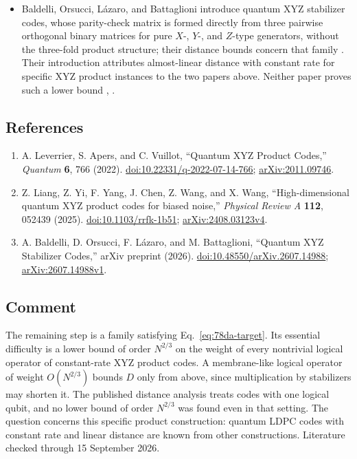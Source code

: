 \begin{itemize}
  \item Baldelli, Orsucci, L\'azaro, and Battaglioni introduce quantum XYZ stabilizer codes, whose parity-check matrix is formed directly from three pairwise orthogonal binary matrices for pure $X$-, $Y$-, and $Z$-type generators, without the three-fold product structure; their distance bounds concern that family . Their introduction attributes almost-linear distance with constant rate for specific XYZ product instances to the two papers above. Neither paper proves such a lower bound , .
\end{itemize}

\subsection*{References}

\begin{enumerate}[label={},leftmargin=4.8em,labelsep=0.5em]
  \footnotesize
  \item[\textup{[LAV22]}]\label{ref:78da-lav}
  A. Leverrier, S. Apers, and C. Vuillot, ``Quantum XYZ Product Codes,'' \emph{Quantum} \textbf{6}, 766 (2022). \href{https://doi.org/10.22331/q-2022-07-14-766}{doi:10.22331/q-2022-07-14-766}; \href{https://arxiv.org/abs/2011.09746}{arXiv:2011.09746}.

  \item[\textup{[LYY+25]}]\label{ref:78da-liang}
  Z. Liang, Z. Yi, F. Yang, J. Chen, Z. Wang, and X. Wang, ``High-dimensional quantum XYZ product codes for biased noise,'' \emph{Physical Review A} \textbf{112}, 052439 (2025). \href{https://doi.org/10.1103/rrfk-1b51}{doi:10.1103/rrfk-1b51}; \href{https://arxiv.org/abs/2408.03123v4}{arXiv:2408.03123v4}.

  \item[\textup{[BOLB26]}]\label{ref:78da-bolb}
  A. Baldelli, D. Orsucci, F. L\'azaro, and M. Battaglioni, ``Quantum XYZ Stabilizer Codes,'' arXiv preprint (2026). \href{https://doi.org/10.48550/arXiv.2607.14988}{doi:10.48550/arXiv.2607.14988}; \href{https://arxiv.org/abs/2607.14988v1}{arXiv:2607.14988v1}.
\end{enumerate}

\subsection*{Comment}

The remaining step is a family satisfying Eq.~\eqref{eq:78da-target}. Its essential difficulty is a lower bound of order $N^{2/3}$ on the weight of every nontrivial logical operator of constant-rate XYZ product codes. A membrane-like logical operator of weight $O(N^{2/3})$ bounds $D$ only from above, since multiplication by stabilizers may shorten it. The published distance analysis treats codes with one logical qubit, and no lower bound of order $N^{2/3}$ was found even in that setting. The question concerns this specific product construction: quantum LDPC codes with constant rate and linear distance are known from other constructions. Literature checked through 15 September 2026.

